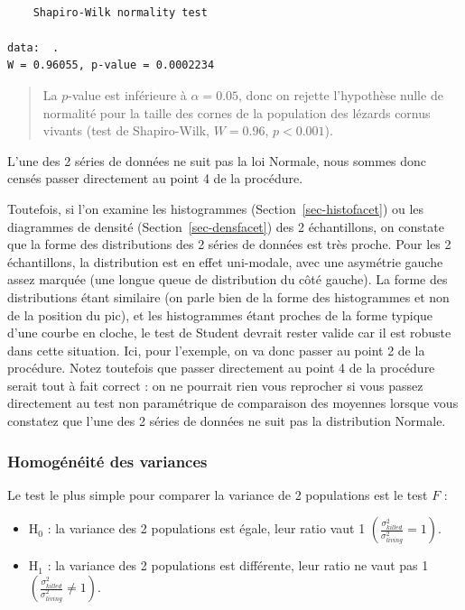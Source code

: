 \documentclass[
  a4paper,
  DIV=11,
  numbers=noendperiod,
  oneside]{scrreprt}
\providecommand{\tightlist}{%
  \setlength{\itemsep}{0pt}\setlength{\parskip}{0pt}}\usepackage{longtable,booktabs,array}
\begin{document}
\begin{verbatim}

    Shapiro-Wilk normality test

data:  .
W = 0.96055, p-value = 0.0002234
\end{verbatim}

\begin{quote}
La \(p\)-value est inférieure à \(\alpha = 0.05\), donc on rejette
l'hypothèse nulle de normalité pour la taille des cornes de la
population des lézards cornus vivants (test de Shapiro-Wilk,
\(W = 0.96\), \(p < 0.001\)).
\end{quote}

L'une des 2 séries de données ne suit pas la loi Normale, nous sommes
donc censés passer directement au point 4 de la procédure.

Toutefois, si l'on examine les histogrammes
(Section~\ref{sec-histofacet}) ou les diagrammes de densité
(Section~\ref{sec-densfacet}) des 2 échantillons, on constate que la
forme des distributions des 2 séries de données est très proche. Pour
les 2 échantillons, la distribution est en effet uni-modale, avec une
asymétrie gauche assez marquée (une longue queue de distribution du côté
gauche). La forme des distributions étant similaire (on parle bien de la
forme des histogrammes et non de la position du pic), et les
histogrammes étant proches de la forme typique d'une courbe en cloche,
le test de Student devrait rester valide car il est robuste dans cette
situation. Ici, pour l'exemple, on va donc passer au point 2 de la
procédure. Notez toutefois que passer directement au point 4 de la
procédure serait tout à fait correct : on ne pourrait rien vous
reprocher si vous passez directement au test non paramétrique de
comparaison des moyennes lorsque vous constatez que l'une des 2 séries
de données ne suit pas la distribution Normale.

\hypertarget{homoguxe9nuxe9ituxe9-des-variances}{%
\subsubsection{Homogénéité des
variances}\label{homoguxe9nuxe9ituxe9-des-variances}}

Le test le plus simple pour comparer la variance de 2 populations est le
test \(F\) :

\begin{itemize}
\tightlist
\item
  H\(_0\) : la variance des 2 populations est égale, leur ratio vaut 1
  \(\left(\frac{\sigma^2_{killed}}{\sigma^2_{living}} = 1\right)\).
\item
  H\(_1\) : la variance des 2 populations est différente, leur ratio ne
  vaut pas 1
  \(\left(\frac{\sigma^2_{killed}}{\sigma^2_{living}} \neq 1\right)\).
\end{itemize}
\end{document}
